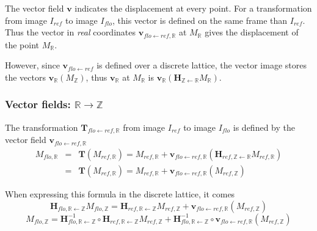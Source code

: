 The vector field $\mathbf{v}$ indicates the displacement at every point. For a transformation from image $I_{ref}$ to image $I_{flo}$, this vector is defined on the same frame than $I_{ref}$. Thus the vector in \textit{real} coordinates $\mathbf{v}_{flo \leftarrow ref, \mathbb{R}}$ at $M_{\mathbb{R}}$ gives the displacement of the point $M_{\mathbb{R}}$.

However, since $\mathbf{v}_{flo \leftarrow ref}$ is defined over a discrete lattice, the vector image stores the vectors $\mathbf{v}_{\mathbb{R}}(M_{\mathbb{Z}})$, thus $\mathbf{v}_{\mathbb{R}}$ at $M_{\mathbb{R}}$ is $\mathbf{v}_{\mathbb{R}}( \mathbf{H}_{\mathbb{Z} \leftarrow \mathbb{R}} M_{\mathbb{R}} )$.


\subsubsection{Vector fields: $\mathbb{R} \rightarrow \mathbb{Z}$}




The transformation $\mathbf{T}_{flo \leftarrow ref, \mathbb{R}}$ from image $I_{ref}$ to image $I_{flo}$ is defined by the vector field $\mathbf{v}_{flo \leftarrow ref,\mathbb{R}}$
\begin{eqnarray*}
M_{flo,\mathbb{R}} & = & 
\mathbf{T}(M_{ref,\mathbb{R}}) = M_{ref,\mathbb{R}} + \mathbf{v}_{flo \leftarrow ref,\mathbb{R}}( \mathbf{H}_{ref, \mathbb{Z} \leftarrow \mathbb{R}} M_{ref,\mathbb{R}} )\\
& = & 
\mathbf{T}(M_{ref,\mathbb{R}}) = M_{ref,\mathbb{R}} + \mathbf{v}_{flo \leftarrow ref,\mathbb{R}}(M_{ref,\mathbb{Z}} )
\end{eqnarray*}

When expressing this formula in the discrete lattice, it comes
\begin{displaymath}
\mathbf{H}_{flo, \mathbb{R} \leftarrow \mathbb{Z}} M_{flo,\mathbb{Z}}
=
\mathbf{H}_{ref, \mathbb{R} \leftarrow \mathbb{Z}} M_{ref,\mathbb{Z}}
+ \mathbf{v}_{flo \leftarrow ref,\mathbb{R}}( M_{ref,\mathbb{Z}} )
\end{displaymath}
\begin{displaymath}
M_{flo,\mathbb{Z}} 
=
\mathbf{H}^{-1}_{flo, \mathbb{R} \leftarrow \mathbb{Z}}
\circ \mathbf{H}_{ref, \mathbb{R} \leftarrow \mathbb{Z}} 
M_{ref,\mathbb{Z}}
+ \mathbf{H}^{-1}_{flo, \mathbb{R} \leftarrow \mathbb{Z}}
\circ \mathbf{v}_{flo \leftarrow ref,\mathbb{R}}( M_{ref,\mathbb{Z}} )
\end{displaymath}


